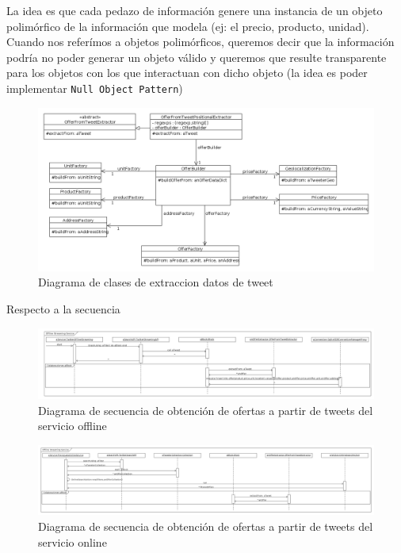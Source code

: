 La idea es que cada pedazo de informaci\'on genere una instancia de un objeto polim\'orfico de la informaci\'on que modela (ej: el precio, producto, unidad).
Cuando nos refer\'imos a objetos polim\'orficos, queremos decir que la informaci\'on podr\'ia no poder generar un objeto v\'alido y queremos que resulte transparente para los objetos con los que interactuan con dicho objeto (la idea es poder implementar \texttt{Null Object Pattern})

\begin{figure}[h]
\centerline{\includegraphics[width=0.9\paperwidth]{./imgs/class_diagram_parsing.png}}
\caption{Diagrama de clases de extraccion datos de tweet}
\label{fig:class_parsing}
\end{figure}

Respecto a la secuencia

\begin{figure}[h]
\centerline{\includegraphics[keepaspectratio,width=\paperwidth,height=\paperheight,keepaspectratio,angle=90]{./imgs/sequence_diagram_offline_extraction.png}}
\caption{Diagrama de secuencia de obtención de ofertas a partir de tweets del servicio offline}
\label{fig:sequence_diagram_offline_extraction}
\end{figure}

\begin{figure}[h]
\centerline{\includegraphics[keepaspectratio,width=\paperwidth,height=\paperheight,keepaspectratio,angle=90]{./imgs/sequence_diagram_online_extraction.png}}
\caption{Diagrama de secuencia de obtención de ofertas a partir de tweets del servicio online}
\label{fig:sequence_diagram_offline_extraction}
\end{figure}


